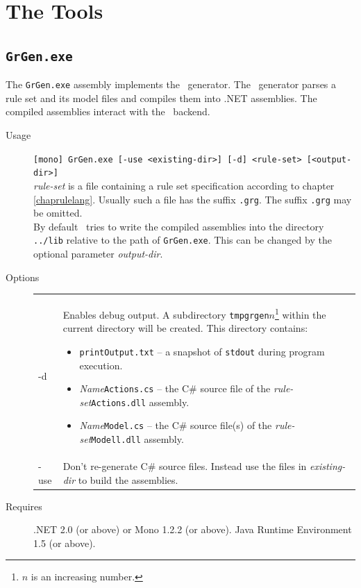 \section{The Tools}

\subsection{\texttt{GrGen.exe}}
The \texttt{GrGen.exe} assembly implements the \GrG\ generator. The \GrG\ generator parses a rule set and its model files and compiles them into .NET assemblies. The compiled assemblies interact with the \GrG\ backend.
\begin{description}
  \item[Usage] \texttt{[mono] GrGen.exe [-use <existing-dir>] [-d] <rule-set> [<output-dir>]}\\
    \emph{rule-set} is a file containing a rule set specification according to chapter \ref{chaprulelang}. Usually such a file has the suffix \texttt{.grg}. The suffix \texttt{.grg} may be omitted.\\
By default \GrG\ tries to write the compiled assemblies into the directory \texttt{../lib} relative to the path of \texttt{GrGen.exe}. This can be changed by the optional parameter \emph{output-dir}.
  \item[Options] \mbox{} 
    \begin{tabularx}{\linewidth}{lX}
      -d & Enables debug output. A subdirectory \texttt{tmpgrgen$n$}\footnote{$n$ is an increasing number.} within the current directory will be created. This directory contains:
\begin{itemize}
  \item \texttt{printOutput.txt} -- a snapshot of \texttt{stdout} during program execution.
  \item \emph{Name}\texttt{Actions.cs} -- the C\# source file of the \emph{rule-set}\texttt{Actions.dll} assembly.
  \item \emph{Name}\texttt{Model.cs} -- the C\# source file(s) of the \emph{rule-set}\texttt{Modell.dll} assembly.
\end{itemize}\\
      -use & Don't re-generate C\# source files. Instead use the files in \emph{existing-dir} to build the assemblies.	
    \end{tabularx}
  \item[Requires] .NET 2.0 (or above) or Mono 1.2.2 (or above). Java Runtime Environment 1.5 (or above).
\end{description}

